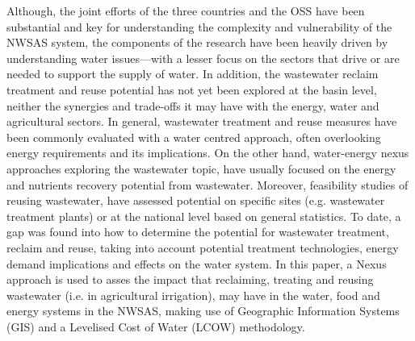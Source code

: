 Although, the joint efforts of the three countries and the OSS have been substantial and key for understanding the complexity and vulnerability of the NWSAS system, the components of the research have been heavily driven by understanding water issues---with a lesser focus on the sectors that drive or are needed to support the supply of water. In addition, the wastewater reclaim treatment and reuse potential has not yet been explored at the basin level, neither the synergies and trade-offs it may have with the energy, water and agricultural sectors. In general, wastewater treatment and reuse measures have been commonly evaluated with a water centred approach, often overlooking energy requirements and its implications. On the other hand, water-energy nexus approaches exploring the wastewater topic, have usually focused on the energy and nutrients recovery potential from wastewater. Moreover, feasibility studies of reusing wastewater, have assessed potential on specific sites (e.g. wastewater treatment plants) or at the national level based on general statistics. To date, a gap was found into how to determine the potential for wastewater treatment, reclaim and reuse, taking into account potential treatment technologies, energy demand implications and effects on the water system. In this paper, a Nexus approach is used to asses the impact that reclaiming, treating and reusing wastewater (i.e. in agricultural irrigation), may have in the water, food and energy systems in the NWSAS, making use of Geographic Information Systems (GIS) and a Levelised Cost of Water (LCOW) methodology.


